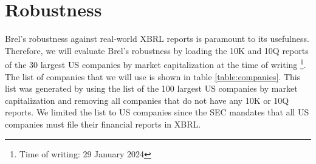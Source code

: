 \section{Robustness}

Brel's robustness against real-world XBRL reports is paramount to its usefulness.
Therefore, we will evaluate Brel's robustness by loading the 10K and 10Q reports of the 30 largest US companies by market capitalization at the time of writing
\footnote{Time of writing: 29 January 2024}.
The list of companies that we will use is shown in table \ref{table:companies}.
This list was generated by using the list of the 100 largest US companies by market capitalization\cite{largest_us_companies} and removing all companies that do not have any 10K or 10Q reports.
We limited the list to US companies since the SEC mandates that all US companies must file their financial reports in XBRL\cite{sec_ixbrl}.



